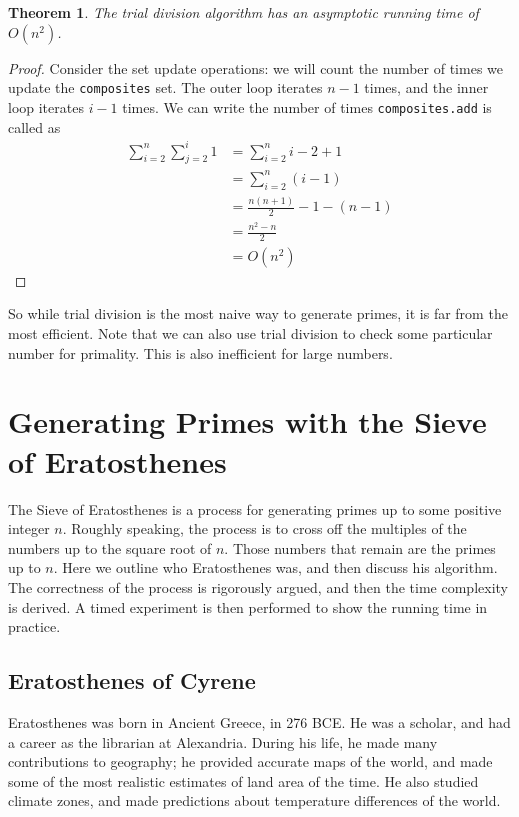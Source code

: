 \documentclass{amsart}
\newtheorem{thm}{Theorem}
\theoremstyle{definition}
\theoremstyle{case}
\begin{document}
	
	\begin{thm}
		The trial division algorithm has an asymptotic running time of $O(n^2)$.
	\end{thm}
	\begin{proof}
		Consider the set update operations: we will count the number of times we update the \texttt{composites} set. The outer loop iterates $n-1$ times, and the inner loop iterates $i-1$ times. We can write the number of times \texttt{composites.add} is called as
		\begin{equation*}
		\begin{split}
		\sum_{i=2}^{n} \sum_{j=2}^{i} 1 & = \sum_{i=2}^{n} i-2+1 \\
		& = \sum_{i=2}^{n} (i-1) \\
		& = \frac{n(n+1)}{2} - 1 - (n-1) \\
		& = \frac{n^2 - n}{2} \\
		& = O(n^2)
		\end{split}
		\end{equation*}
	\end{proof}
	
	So while trial division is the most naive way to generate primes, it is far from the most efficient. Note that we can also use trial division to check some particular number for primality. This is also inefficient for large numbers.
	
	
	\section{Generating Primes with the Sieve of Eratosthenes}
	
	The Sieve of Eratosthenes is a process for generating primes up to some positive integer $n$. Roughly speaking, the process is to cross off the multiples of the numbers up to the square root of $n$. Those numbers that remain are the primes up to $n$. Here we outline who Eratosthenes was, and then discuss his algorithm. The correctness of the process is rigorously argued, and then the time complexity is derived. A timed experiment is then performed to show the running time in practice.
	
	\subsection{Eratosthenes of Cyrene}	
	Eratosthenes was born in Ancient Greece, in 276 BCE. He was a scholar, and had a career as the librarian at Alexandria. During his life, he made many contributions to geography; he provided accurate maps of the world, and made some of the most realistic estimates of land area of the time. He also studied climate zones, and made predictions about temperature differences of the world. 
	
\end{document}
